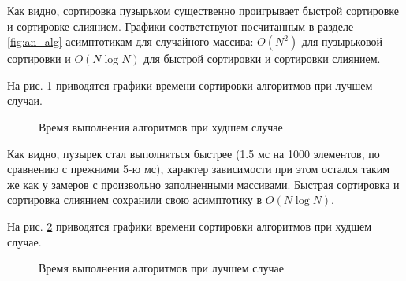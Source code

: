 \documentclass[a4paper,12pt]{article}
\begin{document}
        Как видно, сортировка пузырьком существенно проигрывает быстрой сортировке и сортировке слиянием. Графики соответствуют посчитанным в разделе \ref{fig:an_alg} асимптотикам для случайного массива:  $O(N^2)$ для пузырьковой сортировки и $O(N \log N)$ для быстрой сортировки и сортировки слиянием.
        
                На рис. \ref{fig:graf_2} приводятся графики времени сортировки алгоритмов при лучшем случаи.
         
        \begin{figure}[h!]
            \caption{Время выполнения алгоритмов при худшем случае}
            \label{fig:graf_2}
        \end{figure}
        
        Как видно, пузырек стал выполняться быстрее (1.5 мс на 1000 элементов, по сравнению с прежними 5-ю мс), характер зависимости при этом остался таким же как у замеров с произвольно заполненными массивами. Быстрая сортировка и сортировка слиянием сохранили свою асимптотику в $O(N \log N)$. 
        
         На рис. \ref{fig:graf_3} приводятся графики времени сортировки алгоритмов при худшем случае.
         
        \begin{figure}[h!]
            \caption{Время выполнения алгоритмов при лучшем случае}
            \label{fig:graf_3}
        \end{figure}
        
\end{document}
